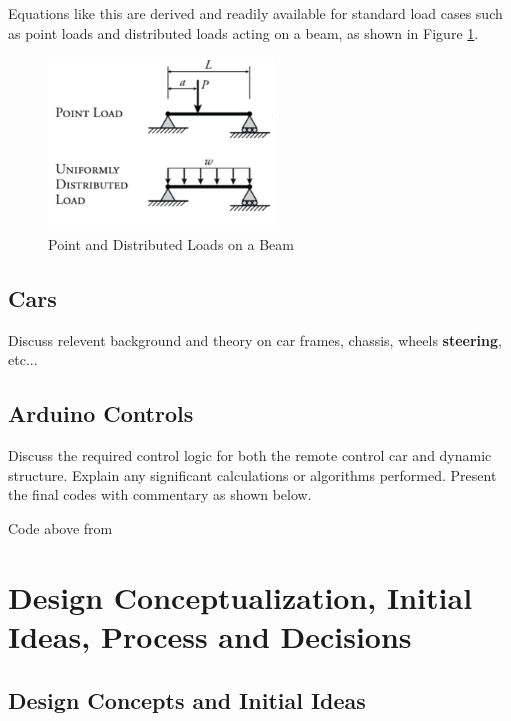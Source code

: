 \documentclass[fleqn,12pt]{project}
\begin{document}
Equations like this are derived and readily available for standard load cases such as point loads and distributed loads acting on a beam, as shown in Figure \ref{fig:Fig2}.
\begin{figure}\centering
\includegraphics[width=6cm]{Figures/Loads}
\caption{Point and Distributed Loads on a Beam \cite{bib:Mechanics}}
\label{fig:Fig2}
\end{figure}

\subsection{Cars}

Discuss relevent background and theory on car frames, chassis, wheels \textbf{steering}, etc...

\subsection{Arduino Controls}
Discuss the required control logic for both the remote control car and dynamic structure. Explain any significant calculations or algorithms performed. Present the final codes with commentary as shown below.

\begin{tcolorbox}[breakable, title=\textbf{fade.h}]

\end{tcolorbox}

Code above from \cite{bib:Fade}

\newpage
\section{Design Conceptualization, Initial Ideas, Process and Decisions}

\subsection{Design Concepts and Initial Ideas}
\end{document}
